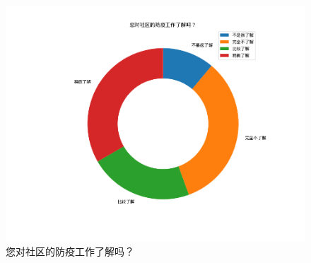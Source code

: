 \documentclass[AutoFakeBold]{LZUThesis}
\begin{document}
\begin{figure}[!h]
	\centering
	\includegraphics[width=4 in]{figures/knowledge.png}
	\caption{您对社区的防疫工作了解吗？}
	\label{fig:knowledge}
\end{figure}


\backmatter
\printbib
\Appendix
\Thanks
\end{document}
